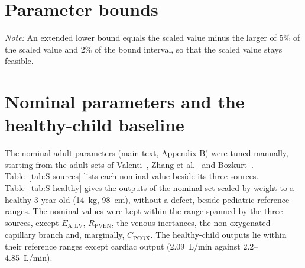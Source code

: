 \documentclass{article}
\begin{document}
\section{Parameter bounds}
\label{sec:S-bounds}
\begin{table}[H]
\centering\small
\setlength{\tabcolsep}{3pt}
\caption{Bounds of the seven calibrated parameters, with the scaled value, the clinical seed and the rule that sets each bound. The bounds were chosen by the authors.}
\label{tab:S-bounds}
\par\vspace{2pt}
{\footnotesize \emph{Note:} An extended lower bound equals the scaled value minus the larger of 5\% of the scaled value and 2\% of the bound interval, so that the scaled value stays feasible.}
\end{table}

\section{Nominal parameters and the healthy-child baseline}
\label{sec:S-baseline}
The nominal adult parameters (main text, Appendix B) were tuned manually, starting from the adult sets of Valenti~\cite{Valenti2023}, Zhang et al.~\cite{zhang2019multiscale} and Bozkurt~\cite{Bozkurt2019}. Table~\ref{tab:S-sources} lists each nominal value beside its three sources. Table~\ref{tab:S-healthy} gives the outputs of the nominal set scaled by weight to a healthy 3-year-old (14~kg, 98~cm), without a defect, beside pediatric reference ranges. The nominal values were kept within the range spanned by the three sources, except $E_{\mathrm{A,LV}}$, $R_{\mathrm{PVEN}}$, the venous inertances, the non-oxygenated capillary branch and, marginally, $C_{\mathrm{PCOX}}$. The healthy-child outputs lie within their reference ranges except cardiac output (2.09~L/min against 2.2--4.85~L/min).
\end{document}
